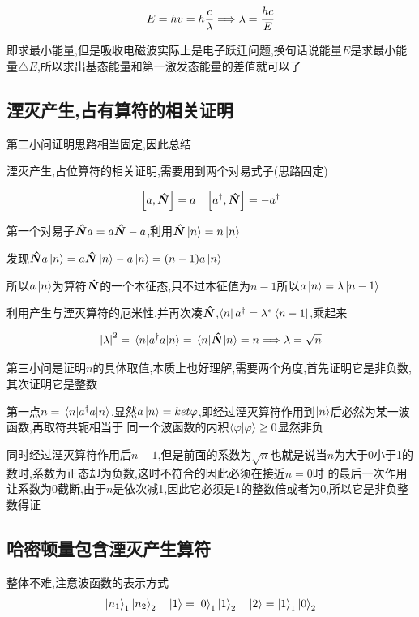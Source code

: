 \documentclass{article}
\begin{document}
            $$
            E = hv = h \frac{c}{\lambda} \Longrightarrow \lambda = \frac{hc}{E}
            $$

            即求最小能量,但是吸收电磁波实际上是电子跃迁问题,换句话说能量$E$是求最小能量$\triangle E$,所以求出基态能量和第一激发态能量的差值就可以了

        \subsection{湮灭产生,占有算符的相关证明}
            第二小问证明思路相当固定,因此总结

            \begin{formal}
                湮灭产生,占位算符的相关证明,需要用到两个对易式子(思路固定)

                $$
                \comm{a}{\vu*{N}} = a \quad \comm{a^{\dagger}}{\vu*{N}} = -a^{\dagger}
                $$

                第一个对易子$ \vu*{N}a  = a\vu*{N} - a $,利用$\vu*{N}\ket{n} = n\ket{n}$

                发现$ \vu*{N}a\ket{n} = a\vu*{N}\ket{n} - a\ket{n} = (n-1) a \ket{n} $

                所以$a\ket{n}$为算符$\vu*{N}$的一个本征态,只不过本征值为$n-1$所以$a\ket{n} = \lambda \ket{n-1}$

                利用产生与湮灭算符的厄米性,并再次凑$\vu*{N}$,$\bra{n} a^{\dagger} = \lambda^{*} \bra{n-1}$,乘起来

                $$
                \abs{\lambda}^{2} = \ev{a^{\dagger}a}{n} = \ev{\vu*{N}}{n} = n \lra \lambda = \sqrt{n}
                $$
            \end{formal}

            第三小问是证明$n$的具体取值,本质上也好理解,需要两个角度,首先证明它是非负数,其次证明它是整数

            第一点$ n = \ev{a^{\dagger}a}{n} $,显然$a\ket{n} = ket{\varphi}$,即经过湮灭算符作用到$\ket{n}$后必然为某一波函数,再取符共轭相当于
            同一个波函数的内积$ \bra{\varphi}\ket{\varphi} \ge 0$显然非负

            同时经过湮灭算符作用后$n-1$,但是前面的系数为$\sqrt{n}$也就是说当$n$为大于0小于1的数时,系数为正态却为负数,这时不符合的因此必须在接近$n=0$时
            的最后一次作用让系数为0截断,由于$n$是依次减1,因此它必须是1的整数倍或者为0,所以它是非负整数得证


        \subsection{哈密顿量包含湮灭产生算符}
            整体不难,注意波函数的表示方式
            $$
            \ket{n_{1}}_{1} \ket{n_{2}}_{2} \quad \ket{1} = \ket{0}_{1}\ket{1}_{2} \quad \ket{2} = \ket{1}_{1}\ket{0}_{2}
            $$
        
\end{document}
